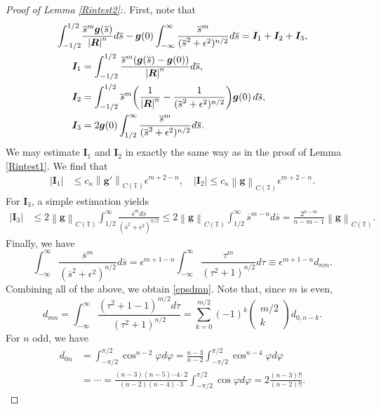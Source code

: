 \documentclass[11pt]{article}
\numberwithin{equation}{section}
\newcommand{\T}{\mathbb{T}}
\newcommand{\bars}{\overline s}
\newcommand{\ts}{\thinspace}
\newcommand{\abs}[1]{\left\lvert #1 \right\rvert}
\newcommand{\norm}[1]{\left\lVert #1 \right\rVert}
\theoremstyle{definition}
\begin{document}
\begin{proof}[Proof of Lemma \ref{Rintest2}:]
First, note that
\begin{equation}
\begin{split}
\int^{1/2}_{-1/2}& \frac{\bars^m \bm{g}(\bars)}{\abs{\bm{R}}^n}d\bars - \bm{g}(0)\int_{-\infty}^{\infty} \frac{\bars^m}{(\bars^2+\epsilon^2)^{n/2}}d\bars =\bm{I}_1+\bm{I}_2+\bm{I}_3, \\
\bm{I}_1 &=\int_{-1/2}^{1/2}\frac{\bars^m (\bm{g}(\bars)-\bm{g}(0))}{\abs{\bm{R}}^n}d\bars,\\
\bm{I}_2 &=\int_{-1/2}^{1/2}\bars^m\bigg(\frac{1}{\abs{\bm{R}}^n}-\frac{1}{(\bars^2+\epsilon^2)^{n/2}}\bigg)\bm{g}(0) \ts d\bars,\\
\bm{I}_3 &=2\bm{g}(0)\int_{1/2}^\infty \frac{\bars^m}{(\bars^2+\epsilon^2)^{n/2}}d\bars.
\end{split}
\end{equation}
We may estimate $\bm{I}_1$ and $\bm{I}_2$ in exactly the same way as in the proof of Lemma \ref{Rintest1}. We find that
\begin{align*}
\abs{\bm{I}_1}&\le c_\kappa \norm{\bm{g}'}_{C(\T)}\epsilon^{m+2-n}, \quad \abs{\bm{I}_2}\le c_\kappa\norm{\bm{g}}_{C(\T)}\epsilon^{m+2-n}.
\end{align*}
For $\bm{I}_3$, a simple estimation yields
\begin{align*}
\abs{\bm{I}_3}&\le 2\norm{\bm{g}}_{C(\T)}\int_{1/2}^\infty \frac{\bars^m d\bars}{(\bars^2+\epsilon^2)^{n/2}} \le 2\norm{\bm{g}}_{C(\T)}\int_{1/2}^\infty \bars^{m-n} d\bars = \frac{2^{n-m}}{n-m-1}\norm{\bm{g}}_{C(\T)}.
\end{align*}
Finally, we have
\[ \int_{-\infty}^{\infty} \frac{\bars^m}{(\bars^2+\epsilon^2)^{n/2}}d\bars = \epsilon^{m+1-n}\int_{-\infty}^{\infty} \frac{\tau^m}{(\tau^2+1)^{n/2}} d\tau \equiv \epsilon^{m+1-n}d_{nm}. \]
Combining all of the above, we obtain \eqref{epsdmn}. Note that, since $m$ is even,
\[d_{mn}=\int_{-\infty}^\infty\frac{(\tau^2+1-1)^{m/2}d\tau}{(\tau^2+1)^{n/2}} =\sum_{k=0}^{m/2}(-1)^k\begin{pmatrix} m/2\\ k\end{pmatrix} d_{0,n-k}. \]
For $n$ odd, we have
\begin{align*}
d_{0n}&=\int_{-\pi/2}^{\pi/2} \cos^{n-2}\varphi d\varphi=
\frac{n-3}{n-2}\int_{-\pi/2}^{\pi/2}\cos^{n-4}\varphi d\varphi\\
&=\cdots=\frac{(n-3)(n-5)\cdots 4\cdot 2}{(n-2)(n-4)\cdot 3}\int_{-\pi/2}^{\pi/2}\cos \varphi d\varphi
=2\frac{(n-3)!!}{(n-2)!!}.
\end{align*}
\end{proof}
\end{document}
